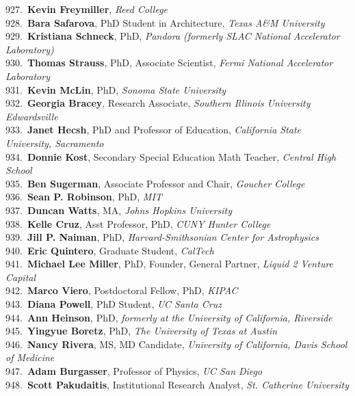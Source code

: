 927.~{\bf Kevin Freymiller}, {\sl Reed College} \\
928.~{\bf Bara Safarova}, PhD Student in Architecture, {\sl Texas A\&M University} \\
929.~{\bf Kristiana Schneck}, PhD, {\sl Pandora (formerly SLAC National Accelerator Laboratory)} \\
930.~{\bf Thomas Strauss}, PhD, Associate Scientist, {\sl Fermi National Accelerator Laboratory } \\
931.~{\bf Kevin McLin}, PhD, {\sl Sonoma State University} \\
932.~{\bf Georgia Bracey}, Research Associate, {\sl Southern Illinois University Edwardsville} \\
933.~{\bf Janet Hecsh}, PhD and Professor of Education, {\sl California State University, Sacramento} \\
934.~{\bf Donnie Kost}, Secondary Special Education Math Teacher, {\sl Central High School} \\
935.~{\bf Ben Sugerman}, Associate Professor and Chair, {\sl Goucher College} \\
936.~{\bf Sean P. Robinson}, PhD, {\sl MIT} \\
937.~{\bf Duncan Watts}, MA, {\sl Johns Hopkins University} \\
938.~{\bf Kelle Cruz}, Asst Professor, PhD, {\sl CUNY Hunter College} \\
939.~{\bf Jill P. Naiman}, PhD, {\sl Harvard-Smithsonian Center for Astrophysics} \\
940.~{\bf Eric Quintero}, Graduate Student, {\sl CalTech} \\
941.~{\bf Michael Lee Miller}, PhD, Founder, General Partner, {\sl Liquid 2 Venture Capital} \\
942.~{\bf Marco Viero}, Postdoctoral Fellow, PhD, {\sl KIPAC} \\
943.~{\bf Diana Powell}, PhD Student, {\sl UC Santa Cruz} \\
944.~{\bf Ann Heinson}, PhD, {\sl formerly at the University of California, Riverside} \\
945.~{\bf Yingyue Boretz}, PhD, {\sl The University of Texas at Austin } \\
946.~{\bf Nancy Rivera}, MS, MD Candidate, {\sl University of California, Davis School of Medicine } \\
947.~{\bf Adam Burgasser}, Professor of Physics, {\sl UC San Diego} \\
948.~{\bf Scott Pakudaitis}, Institutional Research Analyst, {\sl St. Catherine University} \\

